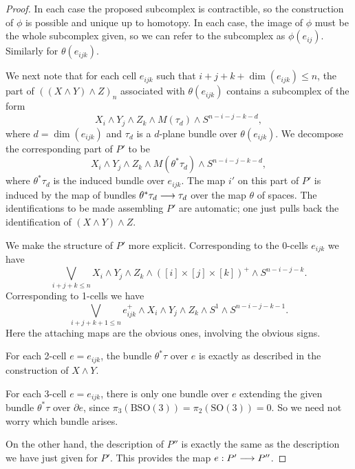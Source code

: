 \documentclass[../main]{subfiles}
\begin{document}
\begin{proof}
In each case the proposed subcomplex is contractible, so the construction of $\phi$ is possible and unique up to homotopy. In each case, the image of $\phi$ must be the whole subcomplex given, so we can refer to the subcomplex as $\phi(e_{ij})$. Similarly for $\theta(e_{ijk})$.

We next note that for each cell $e_{ijk}$ such that $i + j + k + \dim(e_{ijk}) \le n$, the part of $((X \wedge Y) \wedge Z)_n$ associated with $\theta(e_{ijk})$ contains a subcomplex of the form $$X_i \wedge Y_j \wedge Z_k \wedge M(\tau_d) \wedge S^{n - i - j - k - d},$$ where $d = \dim(e_{ijk})$ and $\tau_d$ is a $d$-plane bundle over $\theta(e_{ijk})$. We decompose the corresponding part of $P'$ to be $$X_i \wedge Y_j \wedge Z_k \wedge M(\theta^\ast \tau_d) \wedge S^{n - i - j - k - d},$$ where $\theta^\ast \tau_d$ is the induced bundle over $e_{ijk}$. The map $i'$ on this part of $P'$ is induced by the map of bundles $\theta^\ast \tau_d \overset{}{\longrightarrow} \tau_d$ over the map $\theta$ of spaces. The identifications to be made assembling $P'$ are automatic; one just pulls back the identification of $(X \wedge Y) \wedge Z$. 

We make the structure of $P'$ more explicit. Corresponding to the 0-cells $e_{ijk}$ we have $$\bigvee_{i + j + k \le n} X_i \wedge Y_j \wedge Z_k \wedge ([i] \times [j] \times [k])^+ \wedge S^{n - i - j - k}.$$ Corresponding to 1-cells we have $$\bigvee_{i + j + k + 1 \le n} e_{ijk}^+ \wedge X_i \wedge Y_j \wedge Z_k \wedge S^1 \wedge S^{n - i - j - k - 1}.$$ Here the attaching maps are the obvious ones, involving the obvious signs. 

For each 2-cell $e = e_{ijk}$, the bundle $\theta^\ast \tau$ over $e$ is exactly as described in the construction of $X \wedge Y$.

For each 3-cell $e = e_{ijk}$, there is only one bundle over $e$ extending the given bundle $\theta^\ast \tau$ over $\partial e$, since $\pi_3(\mathrm{BSO}(3)) = \pi_2(\mathrm{SO}(3)) = 0$. So we need not worry which bundle arises. 

On the other hand, the description of $P''$ is exactly the same as the description we have just given for $P'$. This provides the map $e : P' \overset{}{\longrightarrow} P''$. 


\end{proof}
\end{document}
